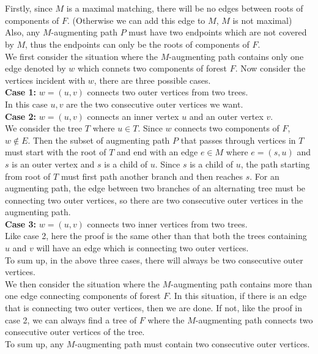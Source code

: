 \documentclass[12pt,letterpaper]{article}
\begin{document}
\section{}
Firstly, since $M$ is a maximal matching, 
there will be no edges between roots of components of $F$.
(Otherwise we can add this edge to $M$, $M$ is not maximal)\\
Also, any $M$-augmenting path $P$ must have two endpoints which are not covered by $M$,
thus the endpoints can only be the roots of components of $F$.\\
\newline
We first consider the situation where
the $M$-augmenting path contains only one edge
denoted by $w$ which connets two components of forest $F$.
Now consider the vertices incident with $w$,
there are three possible cases.\\
\textbf{Case 1:}
$w=(u,v)$ connects two outer vertices from two trees.\\
In this case $u,v$ are the two consecutive outer vertices we want.\\
\textbf{Case 2:}
$w=(u,v)$ connects an inner vertex $u$ and an outer vertex $v$.\\
We consider the tree $T$ where $u\in T$. 
Since $w$ connects two components of $F$, $w\notin E$. 
Then the subset of augmenting path $P$ that passes through vertices in $T$ must 
start with the root of $T$ and end with an edge $e\in M$
where $e=(s,u)$ and $s$ is an outer vertex and $s$ is a child of $u$.
Since $s$ is a child of $u$, 
the path starting from root of $T$ must first path another branch and then reaches $s$.
For an augmenting path, the edge between two branches of an alternating tree
must be connecting two outer vertices,
so there are two consecutive outer vertices in the augmenting path.\\
\textbf{Case 3:}
$w=(u,v)$ connects two inner vertices from two trees.\\
Like case 2, here the proof is the same other than that 
both the trees containing $u$ and $v$ will have an edge 
which is connecting two outer vertices.\\
To sum up, in the above three cases,
there will always be two consecutive outer vertices.\\
\newline 
We then consider the situation where the $M$-augmenting path contains more than one edge
connecting components of forest $F$.
In this situation,
if there is an edge that is connecting two outer vertices, 
then we are done.
If not, like the proof in case 2,
we can always find a tree of $F$ where the $M$-augmenting path
connects two consecutive outer vertices of the tree.\\
\newline
To sum up, 
any $M$-augmenting path must contain two consecutive outer vertices.
\end{document}
